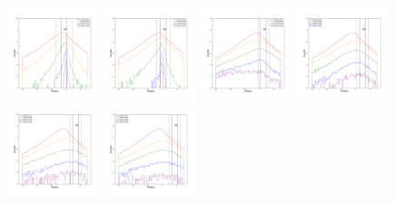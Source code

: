 \documentclass[12pt,prd]{article}
\begin{document}
\begin{figure}[h!]
\includegraphics[width=0.24\textwidth]{../figures/scanning_plotsgaiascan_l99_0_b50_2_ra224_7_dec60_6_npy_10.pdf}
\includegraphics[width=0.24\textwidth]{../figures/scanning_plotsgaiascan_l99_0_b50_2_ra224_7_dec60_6_npy_11.pdf}
\includegraphics[width=0.24\textwidth]{../figures/scanning_plotsgaiascan_l99_0_b50_2_ra224_7_dec60_6_npy_12.pdf}
\includegraphics[width=0.24\textwidth]{../figures/scanning_plotsgaiascan_l99_0_b50_2_ra224_7_dec60_6_npy_13.pdf}
\includegraphics[width=0.24\textwidth]{../figures/scanning_plotsgaiascan_l99_0_b50_2_ra224_7_dec60_6_npy_14.pdf}
\includegraphics[width=0.24\textwidth]{../figures/scanning_plotsgaiascan_l99_0_b50_2_ra224_7_dec60_6_npy_15.pdf}

\end{figure}
\end{document}
